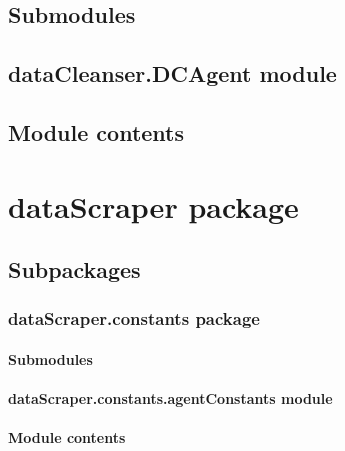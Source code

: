 \documentclass[letterpaper,10pt,english]{sphinxmanual}
\begin{document}
\section{Submodules}
\label{dataCleanser:submodules}

\section{dataCleanser.DCAgent module}
\label{dataCleanser:datacleanser-dcagent-module}

\section{Module contents}
\label{dataCleanser:module-dataCleanser}\label{dataCleanser:module-contents}

\chapter{dataScraper package}
\label{dataScraper::doc}\label{dataScraper:datascraper-package}

\section{Subpackages}
\label{dataScraper:subpackages}

\subsection{dataScraper.constants package}
\label{dataScraper.constants:datascraper-constants-package}\label{dataScraper.constants::doc}

\subsubsection{Submodules}
\label{dataScraper.constants:submodules}

\subsubsection{dataScraper.constants.agentConstants module}
\label{dataScraper.constants:datascraper-constants-agentconstants-module}\label{dataScraper.constants:module-dataScraper.constants.agentConstants}

\subsubsection{Module contents}
\label{dataScraper.constants:module-contents}\label{dataScraper.constants:module-dataScraper.constants}
\end{document}
